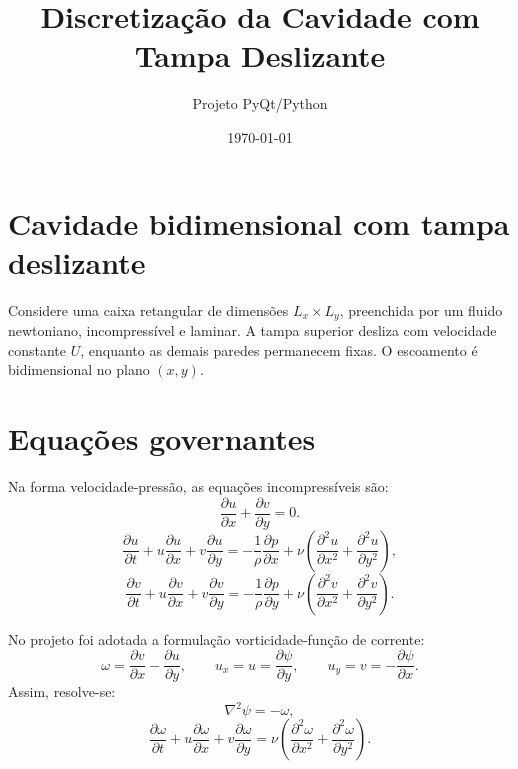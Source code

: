 \documentclass[12pt,a4paper]{article}
\title{Discretização da Cavidade com Tampa Deslizante}
\author{Projeto PyQt/Python}
\date{\today}
\begin{document}
\maketitle

\section*{Cavidade bidimensional com tampa deslizante}

Considere uma caixa retangular de dimensões $L_x \times L_y$, preenchida por um fluido newtoniano, incompressível e laminar. A tampa superior desliza com velocidade constante $U$, enquanto as demais paredes permanecem fixas. O escoamento é bidimensional no plano $(x,y)$.

\section*{Equações governantes}

Na forma velocidade-pressão, as equações incompressíveis são:
\begin{equation}
\frac{\partial u}{\partial x}+\frac{\partial v}{\partial y}=0.
\end{equation}
\begin{equation}
\frac{\partial u}{\partial t}+u\frac{\partial u}{\partial x}+v\frac{\partial u}{\partial y}
= -\frac{1}{\rho}\frac{\partial p}{\partial x}+\nu\left(\frac{\partial^2 u}{\partial x^2}+\frac{\partial^2 u}{\partial y^2}\right),
\end{equation}
\begin{equation}
\frac{\partial v}{\partial t}+u\frac{\partial v}{\partial x}+v\frac{\partial v}{\partial y}
= -\frac{1}{\rho}\frac{\partial p}{\partial y}+\nu\left(\frac{\partial^2 v}{\partial x^2}+\frac{\partial^2 v}{\partial y^2}\right).
\end{equation}

No projeto foi adotada a formulação vorticidade-função de corrente:
\begin{equation}
\omega = \frac{\partial v}{\partial x}-\frac{\partial u}{\partial y},
\qquad
u_x = u = \frac{\partial\psi}{\partial y},
\qquad
u_y = v = -\frac{\partial\psi}{\partial x}.
\end{equation}
Assim, resolve-se:
\begin{equation}
\nabla^2\psi = -\omega,
\end{equation}
\begin{equation}
\frac{\partial\omega}{\partial t} + u\frac{\partial\omega}{\partial x}
+ v\frac{\partial\omega}{\partial y}
= \nu\left(\frac{\partial^2\omega}{\partial x^2}+\frac{\partial^2\omega}{\partial y^2}\right).
\end{equation}
\end{document}
